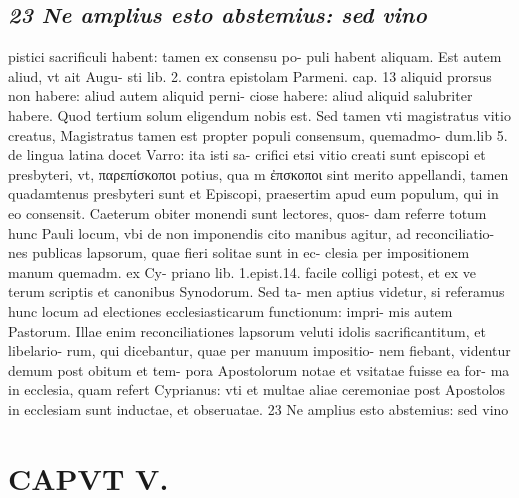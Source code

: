 \documentclass{article}
\begin{document}
\begin{pages}
\subsection*{\textit{23 Ne amplius esto abstemius: sed vino}}pistici sacrificuli habent: tamen ex consensu po- puli habent aliquam. Est autem aliud, vt ait Augu- sti lib. 2. contra epistolam Parmeni. cap. 13 aliquid prorsus non habere: aliud autem aliquid perni- ciose habere: aliud aliquid salubriter habere. Quod tertium solum eligendum nobis est. Sed tamen vti magistratus vitio creatus, Magistratus tamen est propter populi consensum, quemadmo- dum.lib 5. de lingua latina docet Varro: ita isti sa- crifici etsi vitio creati sunt episcopi et presbyteri, vt, παρεπίσκοποι potius, qua m ἐπσκοποι sint merito appellandi, tamen quadamtenus presbyteri sunt et Episcopi, praesertim apud eum populum, qui in eo consensit. Caeterum obiter monendi sunt lectores, quos- dam referre totum hunc Pauli locum, vbi de non imponendis cito manibus agitur, ad reconciliatio- nes publicas lapsorum, quae fieri solitae sunt in ec- clesia per impositionem manum quemadm. ex Cy- priano lib. 1.epist.14. facile colligi potest, et ex ve terum scriptis et canonibus Synodorum. Sed ta- men aptius videtur, si referamus hunc locum ad electiones ecclesiasticarum functionum: impri- mis autem Pastorum. Illae enim reconciliationes lapsorum veluti idolis sacrificantitum, et libelario- rum, qui dicebantur, quae per manuum impositio- nem fiebant, videntur demum post obitum et tem- pora Apostolorum notae et vsitatae fuisse ea for- ma in ecclesia, quam refert Cyprianus: vti et multae aliae ceremoniae post Apostolos in ecclesiam sunt inductae, et obseruatae. 23 Ne amplius esto abstemius: sed vino  \pend
\section*{CAPVT  V. }
\marginpar{[ p.123 ]}\pstart {}
{}

\end{pages}
\end{document}
